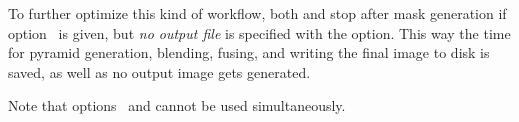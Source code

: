 To further optimize this kind of workflow, both  and 
stop after mask generation if option~ is given, but \emph{no output file}
is specified with the  option.  This way the time for pyramid generation,
blending, fusing, and writing the final image to disk is saved, as well as no output image gets
generated.

Note that options~ and  cannot be used simultaneously.


